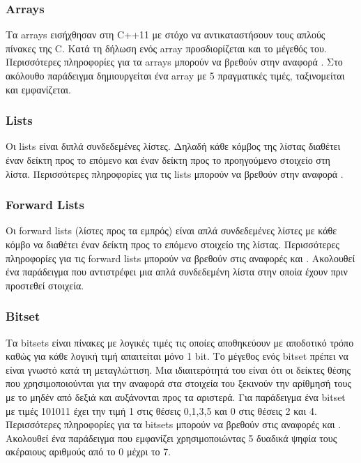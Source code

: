 




\subsubsection{Arrays}
Τα arrays εισήχθησαν στη C++11 με στόχο να αντικαταστήσουν τους απλούς πίνακες της C. Κατά τη δήλωση ενός array προσδιορίζεται και το μέγεθός του. Περισσότερες πληροφορίες για τα arrays μπορούν να βρεθούν στην αναφορά \cite{g4garray}. Στο ακόλουθο παράδειγμα δημιουργείται ένα array με 5 πραγματικές τιμές, ταξινομείται και εμφανίζεται.






\subsubsection{Lists}
Οι lists είναι διπλά συνδεδεμένες λίστες. Δηλαδή κάθε κόμβος της λίστας διαθέτει έναν δείκτη προς το επόμενο και έναν δείκτη προς το προηγούμενο στοιχείο στη λίστα. Περισσότερες πληροφορίες για τις lists μπορούν να βρεθούν στην αναφορά \cite{g4glist}.

\subsubsection{Forward Lists}
Οι forward lists (λίστες προς τα εμπρός) είναι απλά συνδεδεμένες λίστες με κάθε κόμβο να διαθέτει έναν δείκτη προς το επόμενο στοιχείο της λίστας. Περισσότερες πληροφορίες για τις forward lists μπορούν να βρεθούν στις αναφορές \cite{g4gforwardlist1} και \cite{g4gforwardlist2}. Ακολουθεί ένα παράδειγμα που αντιστρέφει μια απλά συνδεδεμένη λίστα στην οποία έχουν πριν προστεθεί στοιχεία.






\subsubsection{Bitset}
Τα bitsets είναι πίνακες με λογικές τιμές τις οποίες αποθηκεύουν με αποδοτικό τρόπο καθώς για κάθε λογική τιμή απαιτείται μόνο 1 bit. Το μέγεθος ενός bitset πρέπει να είναι γνωστό κατά τη μεταγλώττιση. Μια ιδιαιτερότητά του είναι ότι οι δείκτες θέσης που χρησιμοποιούνται για την αναφορά στα στοιχεία του ξεκινούν την αρίθμησή τους με το μηδέν από δεξιά και αυξάνονται προς τα αριστερά. Για παράδειγμα ένα bitset με τιμές 101011 έχει την τιμή 1 στις θέσεις 0,1,3,5 και 0 στις θέσεις 2 και 4. Περισσότερες πληροφορίες για τα bitsets μπορούν να βρεθούν στις αναφορές \cite{g4gbitset1} και \cite{g4gbitset2}. Ακολουθεί ένα παράδειγμα που εμφανίζει χρησιμοποιώντας 5 δυαδικά ψηφία τους ακέραιους αριθμούς από το 0 μέχρι το 7.

